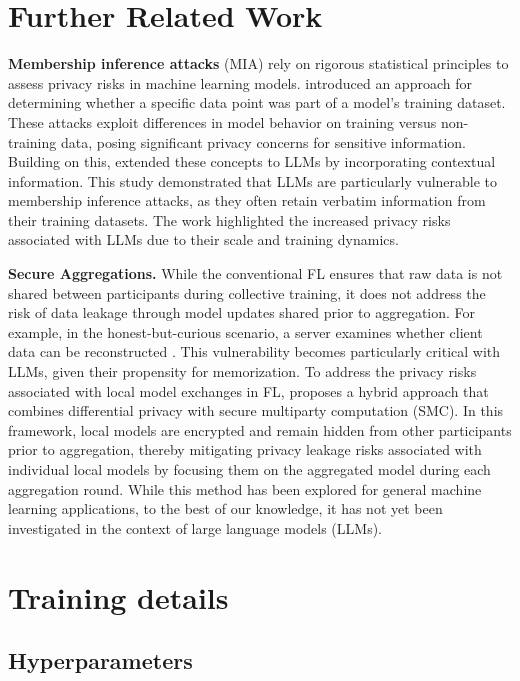 \appendix
\onecolumn
\section{Further Related Work}
\textbf{Membership inference attacks} (MIA) rely on rigorous statistical principles to assess privacy risks in machine learning models. \citep{shokri2017mia} introduced an approach for determining whether a specific data point was part of a model's training dataset. These attacks exploit differences in model behavior on training versus non-training data, posing significant privacy concerns for sensitive information. Building on this, \citep{chang2024miallm} extended these concepts to LLMs by incorporating contextual information. This study demonstrated that LLMs are particularly vulnerable to membership inference attacks, as they often retain verbatim information from their training datasets. The work highlighted the increased privacy risks associated with LLMs due to their scale and training dynamics.

\textbf{Secure Aggregations.} While the conventional FL ensures that raw data is not shared between participants during collective training, it does not address the risk of data leakage through model updates shared prior to aggregation. For example, in the honest-but-curious scenario, a server examines whether client data can be reconstructed \citep{huang2021evaluating}. This vulnerability becomes particularly critical with LLMs, given their propensity for memorization. To address the privacy risks associated with local model exchanges in FL, \citep{truex2019hybrid} proposes a hybrid approach that combines differential privacy with secure multiparty computation (SMC). In this framework, local models are encrypted and remain hidden from other participants prior to aggregation, thereby mitigating privacy leakage risks associated with individual local models by focusing them on the aggregated model during each aggregation round. While this method has been explored for general machine learning applications, to the best of our knowledge, it has not yet been investigated in the context of large language models (LLMs).

\section{Training details}
\label{sec:training_details}

\subsection{Hyperparameters}
\label{sec:hp}

